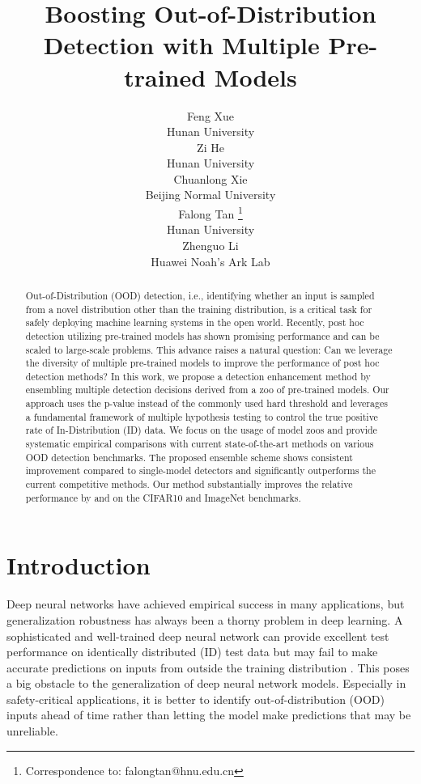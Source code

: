 \documentclass{article} \usepackage{iclr2023_conference,times}
\title{Boosting Out-of-Distribution Detection with Multiple Pre-trained Models}
\author{Feng Xue\\
Hunan University\\
\And
Zi He\\
Hunan University \\
\And
Chuanlong Xie\\
Beijing Normal University\\
\AND 
Falong Tan \thanks{Correspondence to: falongtan@hnu.edu.cn} \\
Hunan University\\
\And
Zhenguo Li\\
Huawei Noah's Ark Lab\\
}
\begin{document}
\maketitle

\begin{abstract}

Out-of-Distribution (OOD) detection, i.e., identifying whether an input is sampled from a novel distribution other than the training distribution, is a critical task for safely deploying machine learning systems in the open world.
Recently, post hoc detection utilizing pre-trained models has shown promising performance and can be scaled to large-scale problems.
This advance raises a natural question: Can we leverage the diversity of multiple pre-trained models to improve the performance of post hoc detection methods?
In this work, we propose a detection enhancement method by ensembling multiple detection decisions derived from a zoo of pre-trained models. Our approach uses the p-value instead of the commonly used hard threshold and leverages a fundamental framework of multiple hypothesis testing to control the true positive rate of In-Distribution (ID) data.
We focus on the usage of model zoos and provide systematic empirical comparisons with current state-of-the-art methods on various OOD detection benchmarks.
The proposed ensemble scheme shows consistent improvement compared to single-model detectors and significantly outperforms the current competitive methods. Our method substantially improves the relative performance by  and  on the CIFAR10 and ImageNet benchmarks.



\end{abstract}

\section{Introduction}

Deep neural networks have achieved empirical success in many applications, but generalization robustness has always been a thorny problem in deep learning.
A sophisticated and well-trained deep neural network can provide excellent test performance on identically distributed (ID) test data but may fail to make accurate predictions on inputs from outside the training distribution \cite {nguyen2015deep}.
This poses a big obstacle to the generalization of deep neural network models.
Especially in safety-critical applications, it is better to identify out-of-distribution (OOD) inputs ahead of time rather than letting the model make predictions that may be unreliable. 
\end{document}
